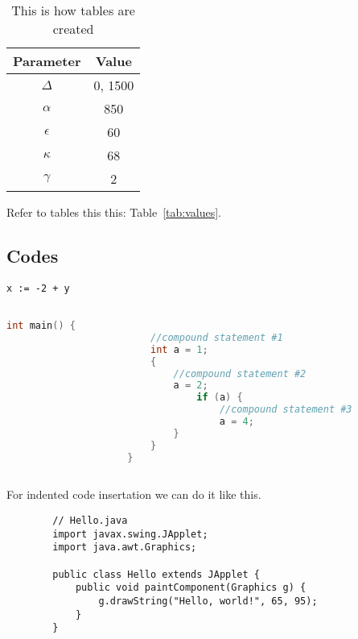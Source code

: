     \begin{table}[H] \center
    \begin{tabular}{c|c}
    Parameter & Value \\ \hline \hline
    $\Delta$ & 0, 1500 \\
    ${\alpha}$ & 850 \\
    ${\epsilon}$ & 60 \\
    ${\kappa}$ & 68 \\
    ${\gamma}$ & 2
    \end{tabular}
    \caption{This is how tables are created}
    \end{table}
    
    
    Refer to tables this this: Table~\ref{tab:values}.

    \subsection{Codes}

    \begin{lstlisting}[caption={My Captions},captionpos=b]
        x := -2 + y
        
        \end{lstlisting}
       
    \begin{lstlisting}[language=C,caption={[short caption]caption text}, captionpos=b]
                     int main() {
                         //compound statement #1 
                         int a = 1;
                         {       
                             //compound statement #2
                             a = 2;
                                 if (a) {
                                     //compound statement #3
                                     a = 4;
                             }
                         }
                     }
            
            \end{lstlisting}
    
    For indented code insertation we can do it like this.
    \begin{verbatim}
        // Hello.java
        import javax.swing.JApplet;
        import java.awt.Graphics;
    
        public class Hello extends JApplet {
            public void paintComponent(Graphics g) {
                g.drawString("Hello, world!", 65, 95);
            }    
        }
    
        \end{verbatim}


